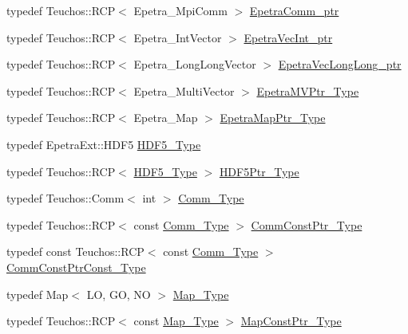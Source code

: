 \begin{DoxyCompactItemize}
\item 
typedef Teuchos\+::\+R\+CP$<$ Epetra\+\_\+\+Mpi\+Comm $>$ \hyperlink{classFEDD_1_1ExporterParaViewAMR_a640af1b8a2d7978df32dd6574a176d16}{Epetra\+Comm\+\_\+ptr}
\item 
typedef Teuchos\+::\+R\+CP$<$ Epetra\+\_\+\+Int\+Vector $>$ \hyperlink{classFEDD_1_1ExporterParaViewAMR_a16211cc24d4d126bed0cd83c1dce6986}{Epetra\+Vec\+Int\+\_\+ptr}
\item 
typedef Teuchos\+::\+R\+CP$<$ Epetra\+\_\+\+Long\+Long\+Vector $>$ \hyperlink{classFEDD_1_1ExporterParaViewAMR_aefdbeefcdd8ef6c5a441cc6d964aea59}{Epetra\+Vec\+Long\+Long\+\_\+ptr}
\item 
typedef Teuchos\+::\+R\+CP$<$ Epetra\+\_\+\+Multi\+Vector $>$ \hyperlink{classFEDD_1_1ExporterParaViewAMR_a2ae7eacc031d9088ac7d9855bd829600}{Epetra\+M\+V\+Ptr\+\_\+\+Type}
\item 
typedef Teuchos\+::\+R\+CP$<$ Epetra\+\_\+\+Map $>$ \hyperlink{classFEDD_1_1ExporterParaViewAMR_aec66ce374c6eea21bfeeddfe76043c5f}{Epetra\+Map\+Ptr\+\_\+\+Type}
\item 
typedef Epetra\+Ext\+::\+H\+D\+F5 \hyperlink{classFEDD_1_1ExporterParaViewAMR_a8fb291b4121b12ae97c3e1e2f7fb0200}{H\+D\+F5\+\_\+\+Type}
\item 
typedef Teuchos\+::\+R\+CP$<$ \hyperlink{classFEDD_1_1ExporterParaViewAMR_a8fb291b4121b12ae97c3e1e2f7fb0200}{H\+D\+F5\+\_\+\+Type} $>$ \hyperlink{classFEDD_1_1ExporterParaViewAMR_aaf76d7e242edf55a27da762fb8c75bc6}{H\+D\+F5\+Ptr\+\_\+\+Type}
\item 
typedef Teuchos\+::\+Comm$<$ int $>$ \hyperlink{classFEDD_1_1ExporterParaViewAMR_a344240d46d7bee09b67e50de26a00526}{Comm\+\_\+\+Type}
\item 
typedef Teuchos\+::\+R\+CP$<$ const \hyperlink{classFEDD_1_1ExporterParaViewAMR_a344240d46d7bee09b67e50de26a00526}{Comm\+\_\+\+Type} $>$ \hyperlink{classFEDD_1_1ExporterParaViewAMR_a240ffec17fbe910bc5530fb23fe8ab41}{Comm\+Const\+Ptr\+\_\+\+Type}
\item 
typedef const Teuchos\+::\+R\+CP$<$ const \hyperlink{classFEDD_1_1ExporterParaViewAMR_a344240d46d7bee09b67e50de26a00526}{Comm\+\_\+\+Type} $>$ \hyperlink{classFEDD_1_1ExporterParaViewAMR_a77750330c4c65121bf2172b7179327bc}{Comm\+Const\+Ptr\+Const\+\_\+\+Type}
\item 
typedef Map$<$ LO, GO, NO $>$ \hyperlink{classFEDD_1_1ExporterParaViewAMR_af41df2bf6463c9a21437f359062cd566}{Map\+\_\+\+Type}
\item 
typedef Teuchos\+::\+R\+CP$<$ const \hyperlink{classFEDD_1_1ExporterParaViewAMR_af41df2bf6463c9a21437f359062cd566}{Map\+\_\+\+Type} $>$ \hyperlink{classFEDD_1_1ExporterParaViewAMR_a0b62499b70ea553b391b3436b292a84b}{Map\+Const\+Ptr\+\_\+\+Type}

\end{DoxyCompactItemize}

